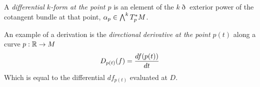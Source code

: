 \documentclass[11pt]{article}
\numberwithin{equation}{section}
\begin{document}
\begin{dfn}
A \textit{differential $k$-form at the point $p$} is an element of the $k\eth$ exterior power of the cotangent bundle at that point, $\alpha _p\in\bigwedge^k T_p^*M$.
\end{dfn}


\begin{ex}
An example of a derivation is the \textit{directional derivative at the point $p(t)$} along a curve $p:\mathbb{R}\rightarrow M$
\begin{align}
  D_{p(t)}(f)
=
  \frac {d f(p(t))}{d t}
\end{align}
Which is equal to the differential $df_{p(t)}$ evaluated at $D$.
\end{ex}
\end{document}
